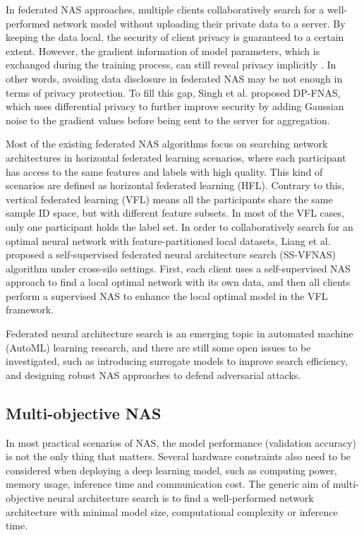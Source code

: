 \documentclass[journal]{IEEEtran}
\begin{document}
In federated NAS approaches, multiple clients collaboratively search for a well-performed network model without uploading their private data to a server. By keeping the data local, the security of client privacy is guaranteed to a certain extent. However, the gradient information of model parameters, which is exchanged during the training process, can still reveal privacy implicitly \cite{zhu2019deep}. In other words, avoiding data disclosure in federated NAS may be not enough in terms of privacy protection. To fill this gap, Singh et al. \cite{singh2020differentially} proposed DP-FNAS, which uses differential privacy \cite{dwork2014algorithmic} to further improve security by adding Gaussian noise to the gradient values before being sent to the server for aggregation.

Most of the existing federated NAS algorithms focus on searching network architectures in horizontal federated learning scenarios, where each participant has access to the same features and labels with high quality. This kind of scenarios are defined as horizontal federated learning (HFL). Contrary to this, vertical federated learning (VFL) means all the participants share the same sample ID space, but with different feature subsets. In most of the VFL cases, only one participant holds the label set. In order to collaboratively search for an optimal neural network with feature-partitioned local datasets, Liang et al. \cite{liang2021self} proposed a self-supervised federated neural architecture search (SS-VFNAS) algorithm under cross-silo settings. First, each client uses a self-supervised NAS approach to find a local optimal network with its own data, and then all clients perform a supervised NAS to enhance the local optimal model in the VFL framework.

Federated neural architecture search is an emerging topic in automated machine (AutoML) learning research, and there are still some open issues to be investigated, such as introducing surrogate models to improve search efficiency, and designing robust NAS approaches to defend adversarial attacks.

\subsection{Multi-objective NAS}

In most practical scenarios of NAS, the model performance (validation accuracy) is not the only thing that matters. Several hardware constraints also need to be considered when deploying a deep learning model, such as computing power, memory usage, inference time and communication cost. The generic aim of multi-objective neural architecture search is to find a well-performed network architecture with minimal model size, computational complexity or inference time.
\end{document}
